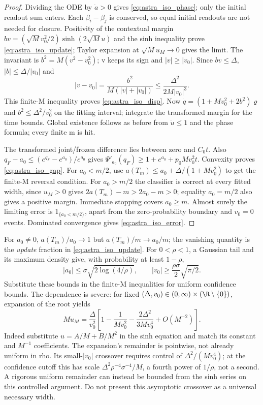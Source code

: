 \begin{proof}
Dividing the ODE by $\dot a>0$ gives
\eqref{eq:astra_iso_phase}; only the initial readout sum enters.
Each $\beta_i-\beta_j$ is conserved, so equal initial readouts are not
needed for closure. Positivity of the contextual margin
$b v=(\sqrt Mv_0^2/2)\sinh(2\sqrt M u)$ and the sinh inequality
prove \eqref{eq:astra_iso_update}; Taylor expansion at
$\sqrt M u_M\to0$ gives the limit. The invariant is
$b^2=M(v^2-v_0^2)$; v keeps its sign and $|v|\ge|v_0|$.
Since $bv\le\Delta$, $|b|\le\Delta/|v_0|$ and
\[
 |v-v_0|=\frac{b^2}{M(|v|+|v_0|)}
 \le\frac{\Delta^2}{2M|v_0|^3}.
\]
This finite-M inequality proves \eqref{eq:astra_iso_disp}.
Now $\dot q=(1+Mv_0^2+2b^2)\varrho$ and
$b^2\le\Delta^2/v_0^2$ on the fitting interval; integrate the
transformed margin for the time bounds. Global existence follows as
before from $\dot u\le1$ and the phase formula; every finite m is hit.

The transformed joint/frozen difference lies between zero and $C_0t$.
Also $q_F-a_0\le(e^{q_F}-e^{a_0})/e^{a_0}$ gives
$\Psi'_{a_0}(q_F)\ge1+e^{a_0}+p_0Mv_0^2t$.
Convexity proves \eqref{eq:astra_iso_gap}. For $a_0<m/2$, use
$a(T_m)\le a_0+\Delta/(1+Mv_0^2)$ to get the finite-M reversal
condition. For $a_0>m/2$ the classifier is correct at every fitted
width, since $u_M>0$ gives $2a(T_m)-m>2a_0-m>0$; equality
$a_0=m/2$ also gives a positive margin. Immediate stopping covers
$a_0\ge m$. Almost surely the limiting error is
$1_{\{a_0<m/2\}}$, apart from the zero-probability boundary and
$v_0=0$ events. Dominated convergence gives \eqref{eq:astra_iso_error}.
\end{proof}

\begin{remark}
For $a_0\ne0$, $a(T_m)/a_0\to1$ but $a(T_m)/m\to a_0/m$;
the vanishing quantity is the \emph{update} fraction in
\eqref{eq:astra_iso_update}. For $0<\rho<1$, a Gaussian tail and its
maximum density give, with probability at least $1-\rho$,
\[
 |a_0|\le\sigma\sqrt{2\log(4/\rho)},\qquad
 |v_0|\ge\frac{\rho\sigma}{2}\sqrt{\pi/2}.
\]
Substitute these bounds in the finite-M inequalities for uniform
confidence bounds. The dependence is severe: for fixed
$(\Delta,v_0)\in(0,\infty)\times(\R\setminus\{0\})$, expansion
of the root yields
\[
 Mu_M=\frac{\Delta}{v_0^2}\left[
 1-\frac1{Mv_0^2}-\frac{2\Delta^2}{3Mv_0^4}+O(M^{-2})\right].
\]
Indeed substitute $u=A/M+B/M^2$ in the sinh equation and match its
constant and $M^{-1}$ coefficients. The expansion's remainder is
pointwise, not already uniform in rho. Its small-$|v_0|$ crossover
requires control of $\Delta^2/(Mv_0^4)$; at the confidence cutoff this
has scale $\Delta^2\rho^{-4}\sigma^{-4}/M$, a fourth power of
$1/\rho$, not a second. A rigorous uniform remainder can instead be
bounded from the sinh series on this controlled argument. Do not
present this asymptotic crossover as a universal necessary width.
\end{remark}

